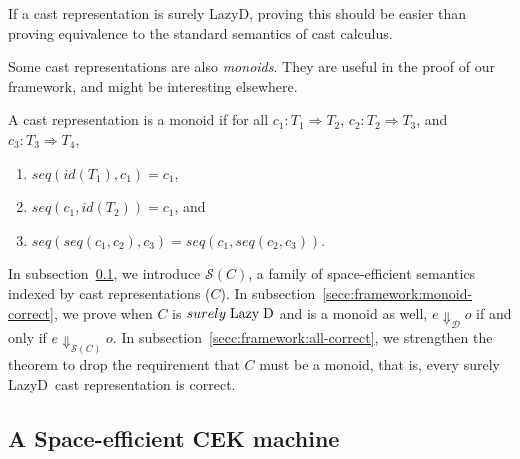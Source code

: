 \documentclass[acmsmall,review,anonymous]{acmart}\settopmatter{printfolios=true,printccs=false,printacmref=false}
\newcommand{\lazyD}{Lazy\;D}
\newcommand{\judgeSeval}[3]{#2 \Downarrow_{\mathcal{S}(#1)} #3}
\newcommand{\judgeDeval}[2]{#1 \Downarrow_{\mathcal{D}} #2}
\newcommand{\effCEK}[1]{$ \mathcal{S}(#1) $}
\begin{document}
If a cast representation is surely LazyD, proving this should be easier than 
proving equivalence to the standard semantics of cast calculus.

Some cast representations are also \textit{monoids}. They are useful in the 
proof of our framework, and might be interesting elsewhere.

\begin{definition}[Monoid]
	A cast representation is a monoid if 
	for all
	$c_1 : T_1 \Longrightarrow T_2$,
	$c_2 : T_2 \Longrightarrow T_3$, and
	$c_3 : T_3 \Longrightarrow T_4$,
	\begin{enumerate}
		\item $seq(id(T_1),c_1) = c_1$,
		\item $seq(c_1,id(T_2)) = c_1$, and
		\item $seq(seq(c_1, c_2), c_3) = seq(c_1, seq(c_2, c_3))$.
	\end{enumerate}
\end{definition}

In subsection~\ref{ssec:framework:cek}, we introduce \effCEK{C}, a family 
of space-efficient semantics indexed by cast representations ($ C $). 
In subsection~\ref{secc:framework:monoid-correct}, we prove when $ C $ is 
$ surely \; \text{\lazyD} $ and is a monoid as well, $ \judgeDeval{e}{o} $ if 
and only if $ \judgeSeval{C}{e}{o} $. In 
subsection~\ref{secc:framework:all-correct}, we strengthen the theorem to drop 
the requirement that $ C $ must be a monoid, that is, every surely \lazyD\ cast 
representation is correct.

\subsection{A Space-efficient CEK machine}
\label{ssec:framework:cek}
\end{document}
